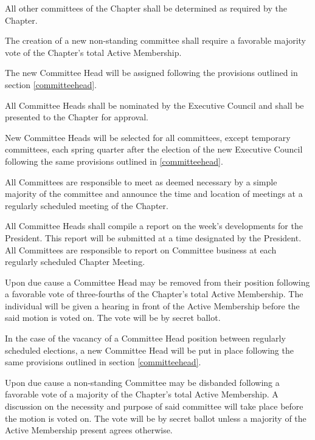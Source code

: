 \documentclass[11pt]{article}
\begin{document}
\begin{legal}
\begin{legal}
      \item 
        All other committees of the Chapter shall be determined as required by the Chapter.
        \begin{legal}
          \item 
            The creation of a new non-standing committee shall require a favorable majority vote of the Chapter’s total Active Membership.
          \item 
            The new Committee Head will be assigned following the provisions outlined in section \ref{committeehead}.
        \end{legal}
    \end{legal}
  \item
    \label{committeehead}
    All Committee Heads shall be nominated by the Executive Council and shall be presented to the Chapter for approval.
  \item
    New Committee Heads will be selected for all committees, except temporary committees, each spring quarter after the election of the new Executive Council following the same provisions outlined in \ref{committeehead}.
  \item
    All Committees are responsible to meet as deemed necessary by a simple majority of the committee and announce the time and location of meetings at a regularly scheduled meeting of the Chapter.
  \item
    All Committee Heads shall compile a report on the week’s developments for the President.
    This report will be submitted at a time designated by the President.
    All Committees are responsible to report on Committee business at each regularly scheduled Chapter Meeting.
  \item
    Upon due cause a Committee Head may be removed from their position following a favorable vote of three-fourths of the Chapter’s total Active Membership.
    The individual will be given a hearing in front of the Active Membership before the said motion is voted on.
    The vote will be by secret ballot.
  \item
    In the case of the vacancy of a Committee Head position between regularly scheduled elections, a new Committee Head will be put in place following the same provisions outlined in section \ref{committeehead}.
  \item
    Upon due cause a non-standing Committee may be disbanded following a favorable vote of a majority of the Chapter’s total Active Membership.
    A discussion on the necessity and purpose of said committee will take place before the motion is voted on.
    The vote will be by secret ballot unless a majority of the Active Membership present agrees otherwise.
\end{legal}
\end{document}
